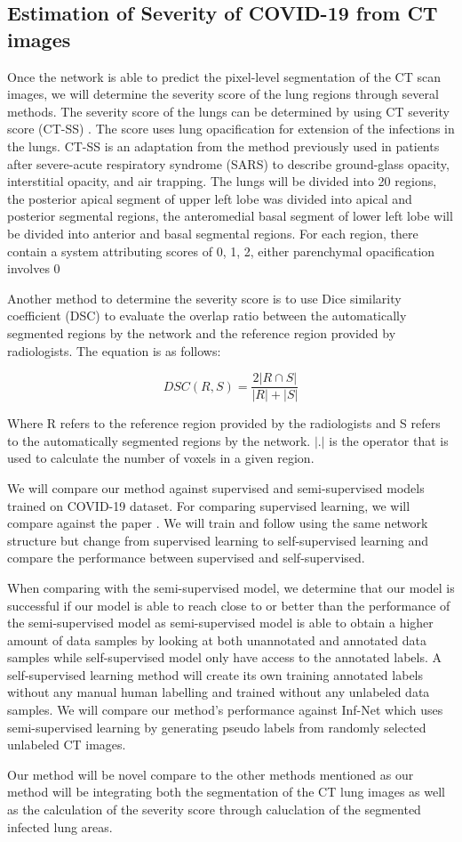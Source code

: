 \subsection{Estimation of Severity of COVID-19 from CT images}
Once the network is able to predict the pixel-level segmentation of the CT scan images, we will determine the severity score of the lung regions through several methods. The severity score of the lungs can be determined by using CT severity score (CT-SS) \cite{ref11}. The score uses lung opacification for extension of the infections in the lungs. CT-SS is an adaptation from the method previously used in patients after severe-acute respiratory syndrome (SARS) \cite{ref10} to describe ground-glass opacity, interstitial opacity, and air trapping. The lungs will be divided into 20 regions, the posterior apical segment of upper left lobe was divided into apical and posterior segmental regions, the anteromedial basal segment of lower left lobe will be divided into anterior and basal segmental regions. For each region, there contain a system attributing scores of 0, 1, 2, either parenchymal opacification involves 0%

Another method to determine the severity score is to use Dice similarity coefficient (DSC) \cite{ref12}  to evaluate the overlap ratio between the automatically segmented regions by the network and the reference region provided by radiologists. The equation is as follows:

\begin{equation}
DSC(R,S)=\frac{2|R\cap S|}{|R|+|S|}
\end{equation}

Where R refers to the reference region provided by the radiologists and S refers to the automatically segmented regions by the network. $|.|$
is the operator that is used to calculate the number of voxels in a given region.

We will compare our method against supervised and semi-supervised \cite{ref13,ref14} models trained on COVID-19 dataset. For comparing supervised learning, we will compare against the paper \cite{ref13}. We will train and follow using the same network structure but change from supervised learning to self-supervised learning and compare the performance between supervised and self-supervised.

When comparing with the semi-supervised model, we determine that our model is successful if our model is able to reach close to or better than the performance of the semi-supervised model as semi-supervised model is able to obtain a higher amount of data samples by looking at both unannotated and annotated data samples while self-supervised model only have access to the annotated labels. A self-supervised learning method will create its own training annotated labels without any manual human labelling and trained without any unlabeled data samples. We will compare our method’s performance against Inf-Net \cite{ref14} which uses semi-supervised learning by generating pseudo labels from randomly selected unlabeled CT images.

Our method will be novel compare to the other methods mentioned as our method will be integrating both the segmentation of the CT lung images as well as the calculation of the severity score through caluclation of the segmented infected lung areas.